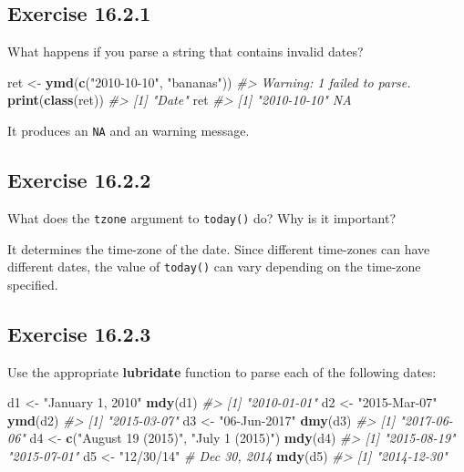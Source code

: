 \documentclass[]{book}
\newenvironment{Shaded}{\begin{snugshade}}{\end{snugshade}}
\newcommand{\CommentTok}[1]{\textcolor[rgb]{0.56,0.35,0.01}{\textit{#1}}}
\newcommand{\KeywordTok}[1]{\textcolor[rgb]{0.13,0.29,0.53}{\textbf{#1}}}
\newcommand{\NormalTok}[1]{#1}
\newcommand{\StringTok}[1]{\textcolor[rgb]{0.31,0.60,0.02}{#1}}
\theoremstyle{plain}
\theoremstyle{remark}
\begin{document}
\hypertarget{exercise-16.2.1}{%
\subsection*{\texorpdfstring{Exercise
{16.2.1}}{Exercise 16.2.1}}\label{exercise-16.2.1}}

What happens if you parse a string that contains invalid dates?

\begin{Shaded}
\begin{Highlighting}[]
\NormalTok{ret <-}\StringTok{ }\KeywordTok{ymd}\NormalTok{(}\KeywordTok{c}\NormalTok{(}\StringTok{"2010-10-10"}\NormalTok{, }\StringTok{"bananas"}\NormalTok{))}
\CommentTok{#> Warning: 1 failed to parse.}
\KeywordTok{print}\NormalTok{(}\KeywordTok{class}\NormalTok{(ret))}
\CommentTok{#> [1] "Date"}
\NormalTok{ret}
\CommentTok{#> [1] "2010-10-10" NA}
\end{Highlighting}
\end{Shaded}

It produces an \texttt{NA} and an warning message.

\hypertarget{exercise-16.2.2}{%
\subsection*{\texorpdfstring{Exercise
{16.2.2}}{Exercise 16.2.2}}\label{exercise-16.2.2}}

What does the \texttt{tzone} argument to \texttt{today()} do? Why is it
important?

It determines the time-zone of the date. Since different time-zones can
have different dates, the value of \texttt{today()} can vary depending
on the time-zone specified.

\hypertarget{exercise-16.2.3}{%
\subsection*{\texorpdfstring{Exercise
{16.2.3}}{Exercise 16.2.3}}\label{exercise-16.2.3}}

Use the appropriate \textbf{lubridate} function to parse each of the
following dates:

\begin{Shaded}
\begin{Highlighting}[]
\NormalTok{d1 <-}\StringTok{ "January 1, 2010"}
\KeywordTok{mdy}\NormalTok{(d1)}
\CommentTok{#> [1] "2010-01-01"}
\NormalTok{d2 <-}\StringTok{ "2015-Mar-07"}
\KeywordTok{ymd}\NormalTok{(d2)}
\CommentTok{#> [1] "2015-03-07"}
\NormalTok{d3 <-}\StringTok{ "06-Jun-2017"}
\KeywordTok{dmy}\NormalTok{(d3)}
\CommentTok{#> [1] "2017-06-06"}
\NormalTok{d4 <-}\StringTok{ }\KeywordTok{c}\NormalTok{(}\StringTok{"August 19 (2015)"}\NormalTok{, }\StringTok{"July 1 (2015)"}\NormalTok{)}
\KeywordTok{mdy}\NormalTok{(d4)}
\CommentTok{#> [1] "2015-08-19" "2015-07-01"}
\NormalTok{d5 <-}\StringTok{ "12/30/14"} \CommentTok{# Dec 30, 2014}
\KeywordTok{mdy}\NormalTok{(d5)}
\CommentTok{#> [1] "2014-12-30"}
\end{Highlighting}
\end{Shaded}
\end{document}
